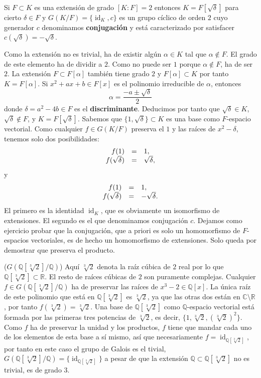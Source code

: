 
Si \(F\subset K\) es una extensión de grado \([K:F]=2\) entonces
\(K=F[\sqrt{\delta}]\) para cierto \(\delta\in F\) y
\(G(K/F)=\{\operatorname{id}_K,c\}\) es un grupo cíclico de orden
\(2\) cuyo generador \(c\) denominamos \textbf{conjugación} y está
caracterizado por satisfacer \(c(\sqrt{\delta})=-\sqrt{\delta}\).


Como la extensión no es trivial, ha de existir algún \(\alpha\in K\) tal
que \(\alpha\notin F\). El grado de este elemento ha de dividir a \(2\).
Como no puede ser \(1\) porque \(\alpha\notin F\), ha de ser \(2\). La
extensión \(F\subset F[\alpha]\) también tiene grado \(2\) y
\(F[\alpha]\subset K\) por tanto \(K=F[\alpha]\). Si
\(x^2+ax+b\in F[x]\) es el polinomio irreducible de \(\alpha\), entonces
\[\alpha=\frac{-a\pm\sqrt{\delta}}{2}\] donde \(\delta=a^2-4b\in F\) es
el \textbf{discriminante}. Deducimos por tanto que
\(\sqrt{\delta}\in K\), \(\sqrt{\delta}\notin F\), y
\(K=F[\sqrt{\delta}]\). Sabemos que \(\{1,\sqrt{\delta}\}\subset K\)
es una base como \(F\)-espacio vectorial. Como cualquier \(f\in G(K/F)\)
preserva el \(1\) y las raíces de \(x^2-\delta\), tenemos solo dos
posibilidades:
\[\begin{array}{rcl}f(1)&=&1,\cr f(\sqrt{\delta})&=&\sqrt{\delta},\end{array}\]
y
\[\begin{array}{rcl}f(1)&=&1,\cr f(\sqrt{\delta})&=&-\sqrt{\delta}.\end{array}\]
El primero es la identidad \(\operatorname{id}_{K}\), que es obviamente
un isomorfismo de extensiones. El segundo es el que denominamos
conjugación \(c\). Dejamos como ejercicio probar que la conjugación, que
a priori es solo un homomorfismo de \(F\)-espacios vectoriales, es de
hecho un homomorfismo de extensiones. Solo queda por demostrar que
preserva el producto. 

\textrm{\normalfont ($G(\mathbb Q[\sqrt[3]{2}]/\mathbb Q)$)}
Aquí \(\sqrt[3]{2}\) denota la raíz cúbica de \(2\) real por lo que
\(\mathbb Q[\sqrt[3]{2}]\subset\mathbb R\). El resto de raíces cúbicas
de \(2\) son puramente complejas. Cualquier
\(f \in G(\mathbb Q[\sqrt[3]{2}]/\mathbb Q)\) ha de preservar las raíces
de \(x^3-2\in\mathbb Q[x]\). La única raíz de este polinomio que está en
\(\mathbb Q[\sqrt[3]{2}]\) es \(\sqrt[3]{2}\), ya que las otras dos
están en \(\mathbb{C}\setminus\mathbb{R}\), por tanto
\(f(\sqrt[3]{2})=\sqrt[3]{2}\). Una base de \(\mathbb Q[\sqrt[3]{2}]\)
como \(\mathbb Q\)-espacio vectorial está formada por las primeras tres
potencias de \(\sqrt[3]{2}\), es decir,
\(\{1,\sqrt[3]{2},(\sqrt[3]{2})^2\}\). Como \(f\) ha de preservar la
unidad y los productos, \(f\) tiene que mandar cada uno de los elementos
de esta base a sí mismo, así que necesariamente
\(f=\operatorname{id}_{\mathbb Q[\sqrt[3]{2}]}\), por tanto en este caso
el grupo de Galois es el tivial,
\(G(\mathbb Q[\sqrt[3]{2}]/\mathbb Q)=\{\operatorname{id}_{\mathbb Q[\sqrt[3]{2}]}\}\)
a pesar de que la extensión \(\mathbb Q\subset \mathbb Q[\sqrt[3]{2}]\)
no es trivial, es de grado \(3\). 

